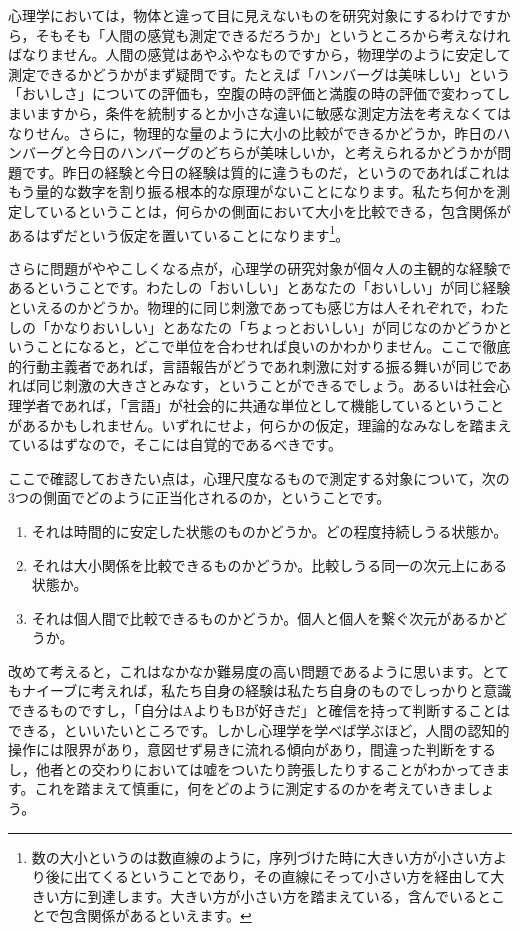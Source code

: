 \documentclass{ltjsbook}
\begin{document}
心理学においては，物体と違って目に見えないものを研究対象にするわけですから，そもそも「人間の感覚も測定できるだろうか」というところから考えなければなりません。人間の感覚はあやふやなものですから，物理学のように安定して測定できるかどうかがまず疑問です。たとえば「ハンバーグは美味しい」という「おいしさ」についての評価も，空腹の時の評価と満腹の時の評価で変わってしまいますから，条件を統制するとか小さな違いに敏感な測定方法を考えなくてはなりせん。さらに，物理的な量のように大小の比較ができるかどうか，昨日のハンバーグと今日のハンバーグのどちらが美味しいか，と考えられるかどうかが問題です。昨日の経験と今日の経験は質的に違うものだ，というのであればこれはもう量的な数字を割り振る根本的な原理がないことになります。私たち何かを測定しているということは，何らかの側面において大小を比較できる，包含関係があるはずだという仮定を置いていることになります\footnote{数の大小というのは数直線のように，序列づけた時に大きい方が小さい方より後に出てくるということであり，その直線にそって小さい方を経由して大きい方に到達します。大きい方が小さい方を踏まえている，含んでいるとことで包含関係があるといえます。}。

さらに問題がややこしくなる点が，心理学の研究対象が個々人の主観的な経験であるということです。わたしの「おいしい」とあなたの「おいしい」が同じ経験といえるのかどうか。物理的に同じ刺激であっても感じ方は人それぞれで，わたしの「かなりおいしい」とあなたの「ちょっとおいしい」が同じなのかどうかということになると，どこで単位を合わせれば良いのかわかりません。ここで徹底的行動主義者であれば，言語報告がどうであれ刺激に対する振る舞いが同じであれば同じ刺激の大きさとみなす，ということができるでしょう。あるいは社会心理学者であれば，「言語」が社会的に共通な単位として機能しているということがあるかもしれません。いずれにせよ，何らかの仮定，理論的なみなしを踏まえているはずなので，そこには自覚的であるべきです。

ここで確認しておきたい点は，心理尺度なるもので測定する対象について，次の3つの側面でどのように正当化されるのか，ということです。
\begin{enumerate}
    \item それは時間的に安定した状態のものかどうか。どの程度持続しうる状態か。
    \item それは大小関係を比較できるものかどうか。比較しうる同一の次元上にある状態か。
    \item それは個人間で比較できるものかどうか。個人と個人を繋ぐ次元があるかどうか。
\end{enumerate}

改めて考えると，これはなかなか難易度の高い問題であるように思います。とてもナイーブに考えれば，私たち自身の経験は私たち自身のものでしっかりと意識できるものですし，「自分はAよりもBが好きだ」と確信を持って判断することはできる，といいたいところです。しかし心理学を学べば学ぶほど，人間の認知的操作には限界があり，意図せず易きに流れる傾向があり，間違った判断をするし，他者との交わりにおいては嘘をついたり誇張したりすることがわかってきます。これを踏まえて慎重に，何をどのように測定するのかを考えていきましょう。
\end{document}
